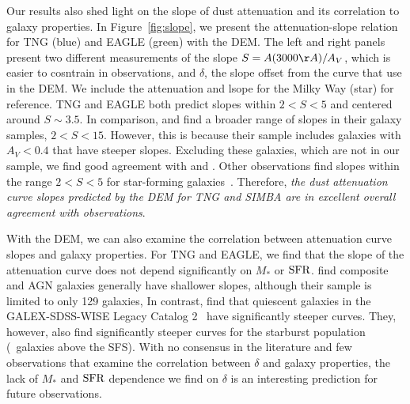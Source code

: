 Our results also shed light on the slope of dust attenuation and its
correlation to galaxy properties. In Figure~\ref{fig:slope}, we present the
attenuation-slope relation for TNG (blue) and EAGLE (green) with the DEM. The
left and right panels present two different measurements of the slope $S =
A(3000\AA)/A_V$, which is easier to cosntrain in observations, and $\delta$,
the slope offset from the \cite{calzetti2001} curve that use in the DEM. 
We include the attenuation and lsope for the Milky Way (star) for reference.
TNG and EAGLE both predict slopes within $2 < S < 5$ and centered around $S\sim
3.5$. In comparison, \cite{leja2017} and \cite{salim2018} find a broader range 
of slopes in their galaxy samples, $2 < S < 15$. However, this is because their
sample includes galaxies with $A_V < 0.4$ that have steeper slopes. Excluding
these galaxies, which are not in our sample, we find good agreement with 
\cite{leja2017} and \cite{salim2018}. Other observations find slopes within 
the range $2 < S < 5$ for star-forming galaxies~\citep{calzetti2000, burgarella2005, johnson2007,
conroy2010, wild2011, battisti2016, battisti2017}. Therefore, \emph{the dust
attenuation curve slopes predicted by the DEM for TNG and SIMBA are in
excellent overall agreement with observations}. 


With the DEM, we can also examine the correlation between attenuation curve
slopes and galaxy properties. For TNG and EAGLE, we find that the slope of the
attenuation curve does not depend significantly on $M_*$ or ${\rm SFR}$.
\cite{leja2017} find composite and AGN galaxies generally have shallower  
slopes, although their sample is limited to only 129 galaxies, In contrast,
\cite{salim2018} find that quiescent galaxies in the GALEX-SDSS-WISE Legacy
Catalog 2~\citep[GSWLC2;][]{salim2019} have significantly steeper curves. They,
however, also find significantly steeper curves for the starburst population 
(\ie~galaxies above the SFS). With no consensus in the literature and few
observations that examine the correlation between $\delta$ and galaxy
properties, the lack of $M_*$ and ${\rm SFR}$ dependence we find on $\delta$ is an
interesting prediction for future observations. 

